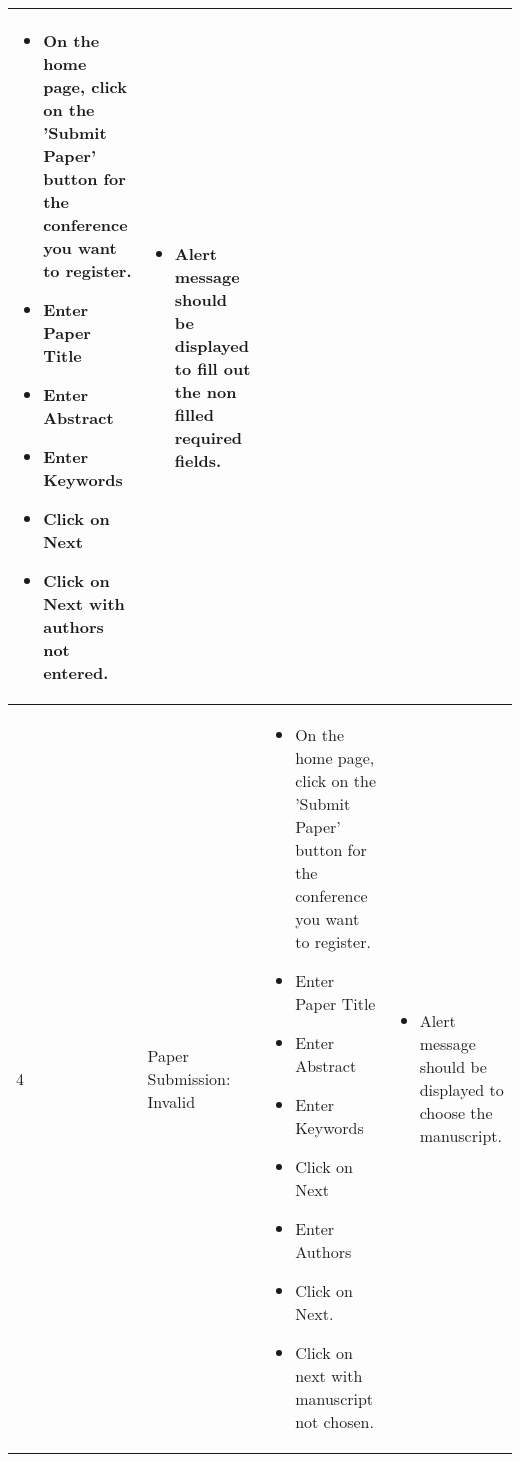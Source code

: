 \documentclass[english,a4paper,12pt]{report}
\begin{document}
\begin{longtable} { | p{2cm} | p{3cm}| p{6cm}| p{6cm} |}
\vspace{-5mm}
\begin{itemize}
\item On the home page, click on the 'Submit Paper' button for the conference you want to register.
\item Enter Paper Title
\item Enter Abstract
\item Enter Keywords
\item Click on Next
\item Click on Next with authors not entered.
\end{itemize}&
\vspace{-5mm}
\begin{itemize}
\item Alert message should be displayed to fill out the non filled required fields.
\end{itemize}\\
\hline 4 &  Paper Submission: Invalid &  
\vspace{-5mm}
\begin{itemize}
\item On the home page, click on the 'Submit Paper' button for the conference you want to register.
\item Enter Paper Title
\item Enter Abstract
\item Enter Keywords
\item Click on Next
\item Enter Authors
\item Click on Next.
\item Click on next with manuscript not chosen.
\end{itemize}&
\vspace{-5mm}
\begin{itemize}
\item Alert message should be displayed to choose the manuscript.
\end{itemize}\\

\hline
\end{longtable}
\newpage  
\end{document}

